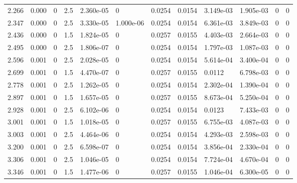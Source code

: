 \documentclass[preview]{standalone}
\begin{document}
{{\begin{tabular}{L{1.2cm}C{1.2cm} C{0.3cm}C{0.5cm} C{1.4cm}C{1.4cm} C{1.4cm}C{1.4cm} C{1.6cm}C{1.6cm} C{1.6cm}C{1.6cm}}
  2.266  &  0.000  & 0     & 2.5 &  2.360e-05  & 0  &  0.0254&   0.0154& 3.149e-03 & 1.905e-03   &  0 & 0  \\ 
  2.347  &  0.000  & 0     & 2.5 &  3.330e-05  & 1.000e-06  &  0.0254&   0.0154& 6.361e-03 & 3.849e-03   &  0 & 0  \\ 
  2.436  &  0.000  & 0     & 1.5 &  1.824e-05  & 0  &  0.0257&   0.0155& 4.403e-03 & 2.664e-03   &  0 & 0  \\ 
  2.495  &  0.000  & 0     & 2.5 &  1.806e-07  & 0  &  0.0254&   0.0154& 1.797e-03 & 1.087e-03   &  0 & 0  \\ 
  2.596  &  0.001  & 0     & 2.5 &  2.028e-05  & 0  &  0.0254&   0.0154& 5.614e-04 & 3.400e-04   &  0 & 0  \\ 
  2.699  &  0.001  & 0     & 1.5 &  4.470e-07  & 0  &  0.0257&   0.0155& 0.0112 & 6.798e-03   &  0 & 0  \\ 
  2.778  &  0.001  & 0     & 2.5 &  1.262e-05  & 0  &  0.0254&   0.0154& 2.302e-04 & 1.390e-04   &  0 & 0  \\ 
  2.897  &  0.001  & 0     & 1.5 &  1.657e-05  & 0  &  0.0257&   0.0155& 8.673e-04 & 5.250e-04   &  0 & 0  \\ 
  2.928  &  0.001  & 0     & 2.5 &  6.102e-06  & 0  &  0.0254&   0.0154& 0.0123 & 7.433e-03   &  0 & 0  \\ 
  3.001  &  0.001  & 0     & 1.5 &  1.018e-05  & 0  &  0.0257&   0.0155& 6.755e-03 & 4.087e-03   &  0 & 0  \\ 
  3.003  &  0.001  & 0     & 2.5 &  4.464e-06  & 0  &  0.0254&   0.0154& 4.293e-03 & 2.598e-03   &  0 & 0  \\ 
  3.200  &  0.001  & 0     & 2.5 &  6.598e-07  & 0  &  0.0254&   0.0154& 3.856e-04 & 2.330e-04   &  0 & 0  \\ 
  3.306  &  0.001  & 0     & 2.5 &  1.046e-05  & 0  &  0.0254&   0.0154& 7.724e-04 & 4.670e-04   &  0 & 0  \\ 
  3.346  &  0.001  & 0     & 1.5 &  1.477e-06  & 0  &  0.0257&   0.0155& 1.046e-04 & 6.300e-05   &  0 & 0  \\ 
\hline 
\end{tabular} 

}}
\end{document}
